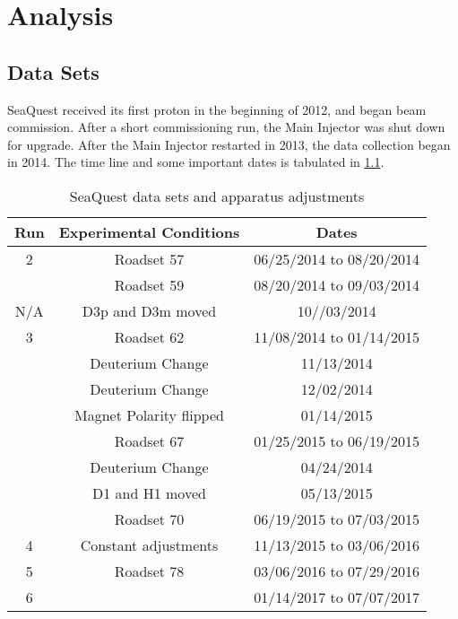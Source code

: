 \documentclass[../main.tex]{subfiles}
\begin{document}
\ifSubfilesClassLoaded{
	\mainmatter
	\setcounter{chapter}{2}
}{}

\chapter{Analysis}
\label{ch:analysis}

\section{Data Sets}
SeaQuest received its first proton in the beginning of 2012, and began beam
commission. After a short commissioning run, the Main Injector was shut down for
upgrade. After the Main Injector restarted in 2013, the data collection began in
2014. The time line and some important dates is tabulated in \cref{tab:dataset}.
\begin{table}[h!]
	\centering
	\begin{tabular}{ c c c }
		\hline
		Run & Experimental Conditions & Dates                    \\
		\hline
		2   & Roadset 57              & 06/25/2014 to 08/20/2014 \\
		    & Roadset 59              & 08/20/2014 to 09/03/2014 \\
		\hline
		N/A & D3p and D3m moved       & 10//03/2014              \\
		\hline
		3   & Roadset 62              & 11/08/2014 to 01/14/2015 \\
		    & Deuterium Change        & 11/13/2014               \\
		    & Deuterium Change        & 12/02/2014               \\
		    & Magnet Polarity flipped & 01/14/2015               \\
		    & Roadset 67              & 01/25/2015 to 06/19/2015 \\
		    & Deuterium Change        & 04/24/2014               \\
		    & D1 and H1 moved         & 05/13/2015               \\
		    & Roadset 70              & 06/19/2015 to 07/03/2015 \\
		\hline
		4   & Constant adjustments    & 11/13/2015 to 03/06/2016 \\
		5   & Roadset 78              & 03/06/2016 to 07/29/2016 \\
		6   &                         & 01/14/2017 to 07/07/2017 \\
	\end{tabular}
	\caption{SeaQuest data sets and apparatus adjustments}
	\label{tab:dataset}
\end{table}
\end{document}
